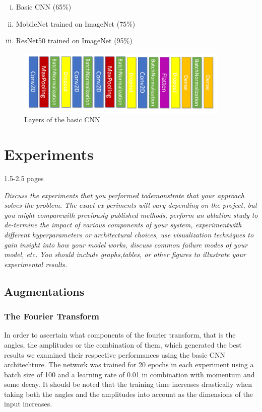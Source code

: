 \documentclass{article}
\begin{document}
\begin{enumerate}[(i)]
 \item Basic CNN (65\%)
 \item MobileNet trained on ImageNet (75\%)
 \item ResNet50 trained on ImageNet (95\%)
\end{enumerate}

\begin{figure}[H]
	\centering
	\includegraphics[width=0.9\textwidth]{conv.PNG}
	\caption{Layers of the basic CNN}
\end{figure}

\section{Experiments}

1.5-2.5 pages

\textit{Discuss the experiments that you performed todemonstrate  that  your  approach  solves  the  problem.   The  exact  ex-periments will vary depending on the project, but you might comparewith previously published methods, perform an ablation study to de-termine the impact of various components of your system, experimentwith different hyperparameters or architectural choices, use visualization  techniques  to  gain  insight  into  how  your  model  works,  discuss common failure modes of your model, etc.  You should include graphs,tables, or other figures to illustrate your experimental results.}

\subsection{Augmentations}

\subsubsection{The Fourier Transform}

In order to ascertain what components of the fourier transform, that is the angles, the amplitudes or the combination of them, which generated the best results we examined their respective performances using the basic CNN architechture. The network was trained for 20 epochs in each experiment using a batch size of 100 and a learning rate of 0.01 in combination with momentum and some decay. It should be noted that the training time increases drastically when taking both the angles and the amplitudes into account as the dimensions of the input increases.
\end{document}
